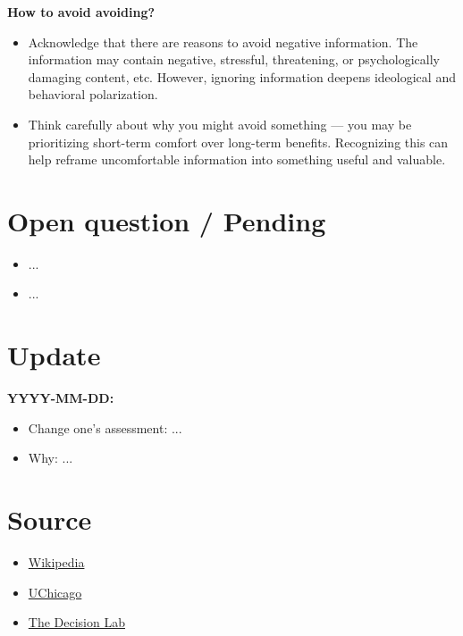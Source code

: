 \documentclass{../researchlog}
\begin{document}
\textbf{How to avoid avoiding?}

\begin{itemize}[leftmargin=*]
    \item Acknowledge that there are reasons to avoid negative information. The information may contain negative, stressful, threatening, or psychologically damaging content, etc. However, ignoring information deepens ideological and behavioral polarization.
    \item Think carefully about why you might avoid something — you may be prioritizing short-term comfort over long-term benefits. Recognizing this can help reframe uncomfortable information into something useful and valuable.
\end{itemize}

\section{Open question / Pending}

\begin{itemize}[leftmargin=*]
    \item ...
    \item ...
\end{itemize}

\section{Update}

\textbf{YYYY-MM-DD:}

\begin{itemize}[leftmargin=*]
    \item Change one's assessment: ...
    \item Why: ...
\end{itemize}

\section{Source}

\begin{itemize}[leftmargin=*]
    \item \href{https://en.wikipedia.org/wiki/Ostrich_effect}{Wikipedia}
    \item \href{https://news.uchicago.edu/story/origins-ostrich-effect}{UChicago}
    \item \href{https://thedecisionlab.com/biases/ostrich-effect}{The Decision Lab}
\end{itemize}
\end{document}
